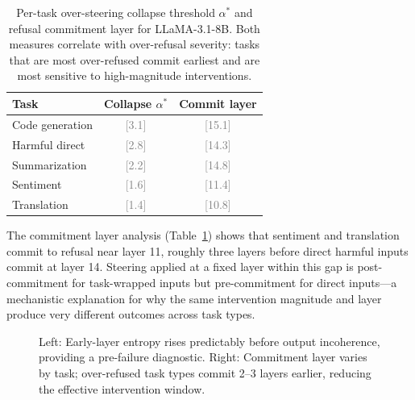 \documentclass[11pt]{article}
\newcommand{\ph}[1]{\textcolor{gray}{[#1]}}
\begin{document}
\begin{table}[h]
\centering
\small
\begin{tabular}{lcc}
\toprule
Task & Collapse $\alpha^*$ & Commit layer \\
\midrule
Code generation & \ph{3.1} & \ph{15.1} \\
Harmful direct  & \ph{2.8} & \ph{14.3} \\
Summarization   & \ph{2.2} & \ph{14.8} \\
Sentiment       & \ph{1.6} & \ph{11.4} \\
Translation     & \ph{1.4} & \ph{10.8} \\
\bottomrule
\end{tabular}
\caption{Per-task over-steering collapse threshold $\alpha^*$ and refusal commitment layer for LLaMA-3.1-8B. Both measures correlate with over-refusal severity: tasks that are most over-refused commit earliest and are most sensitive to high-magnitude interventions.}
\label{tab:thresholds}
\end{table}

The commitment layer analysis (Table~\ref{tab:thresholds}) shows that sentiment and translation commit to refusal near layer 11, roughly three layers before direct harmful inputs commit at layer 14. Steering applied at a fixed layer within this gap is post-commitment for task-wrapped inputs but pre-commitment for direct inputs---a mechanistic explanation for why the same intervention magnitude and layer produce very different outcomes across task types.

\begin{figure}[t]
  \centering
  \caption{Left: Early-layer entropy rises predictably before output incoherence, providing a pre-failure diagnostic. Right: Commitment layer varies by task; over-refused task types commit 2--3 layers earlier, reducing the effective intervention window.}
  \label{fig:entropy}
\end{figure}
\end{document}
